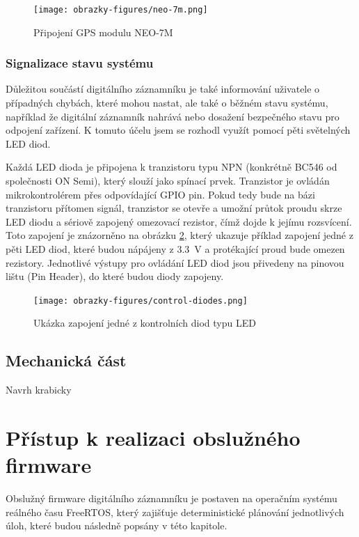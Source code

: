 \begin{figure}[h]
    \centering
    \texttt{[image: obrazky-figures/neo-7m.png]}
    
    \caption{Připojení GPS modulu NEO-7M}
    \label{fig:neo-7m}
\end{figure}

\subsection{Signalizace stavu systému}
Důležitou součástí digitálního záznamníku je také informování uživatele o případných chybách, které mohou nastat, ale také o běžném stavu systému, například že digitální záznamník nahrává nebo dosažení bezpečného stavu pro odpojení zařízení. K tomuto účelu jsem se rozhodl využít pomocí pěti světelných LED diod.

Každá LED dioda je připojena k tranzistoru typu NPN (konkrétně BC546 od společnosti ON Semi), který slouží jako spínací prvek. Tranzistor je ovládán mikrokontrolérem přes odpovídající GPIO pin. Pokud tedy bude na bázi tranzistoru přítomen signál, tranzistor se otevře a umožní průtok proudu skrze LED diodu a sériově zapojený omezovací rezistor, čímž dojde k jejímu rozsvícení. Toto zapojení je znázorněno na obrázku \ref{fig:control-diodes}, který ukazuje příklad zapojení jedné z pěti LED diod, které budou nápájeny z \SI{3.3}{\volt} a protékající proud bude omezen rezistory. Jednotlivé výstupy pro ovládání LED diod jsou přivedeny na pinovou lištu (Pin Header), do které budou diody zapojeny.

\begin{figure}[h]
    \centering
    \texttt{[image: obrazky-figures/control-diodes.png]}
    
    \caption{Ukázka zapojení jedné z kontrolních diod typu LED}
    \label{fig:control-diodes}
\end{figure}

\newpage

\section{Mechanická část}
Navrh krabicky

\chapter{Přístup k realizaci obslužného firmware}
\label{softwarova_implementace}
Obslužný firmware digitálního záznamníku je postaven na operačním systému reálného času FreeRTOS, který zajišťuje deterministické plánování jednotlivých úloh, které budou následně popsány v této kapitole.

